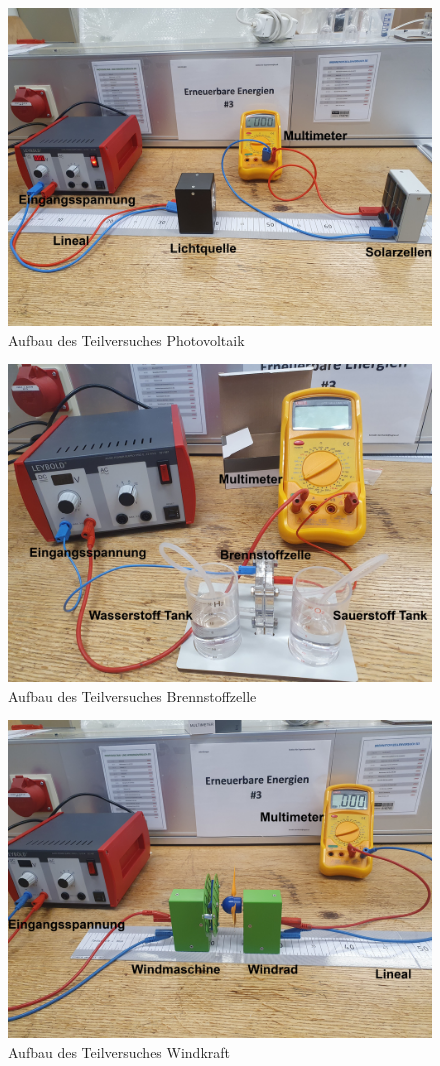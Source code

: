 \documentclass[12pt,a4paper,twoside]{article}
\begin{document}
    \begin{figure}[H]
        \centering
        \includegraphics[width=0.6\linewidth]{nudes/solarzelle aufbau.jpg}
        \caption{Aufbau des Teilversuches Photovoltaik}
        \label{fig:aufbau Photovoltaik}
    \end{figure}

    \begin{figure}[H]
        \centering
        \includegraphics[width=0.6\linewidth]{nudes/brennstoff aufbau.jpg}
        \caption{Aufbau des Teilversuches Brennstoffzelle}
        \label{fig:aufbau Brennstoffzelle}
    \end{figure}

    \begin{figure}[H]
        \centering
        \includegraphics[width=0.6\linewidth]{nudes/wind aufbau.jpg}
        \caption{Aufbau des Teilversuches Windkraft}
        \label{fig:aufbau Windkraft}
    \end{figure}
\end{document}

